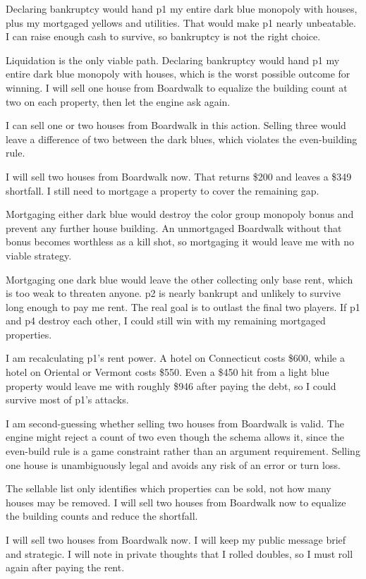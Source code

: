 Declaring bankruptcy would hand p1 my entire dark blue monopoly with houses, plus my mortgaged yellows and utilities. That would make p1 nearly unbeatable. I can raise enough cash to survive, so bankruptcy is not the right choice.

Liquidation is the only viable path. Declaring bankruptcy would hand p1 my entire dark blue monopoly with houses, which is the worst possible outcome for winning. I will sell one house from Boardwalk to equalize the building count at two on each property, then let the engine ask again.

I can sell one or two houses from Boardwalk in this action. Selling three would leave a difference of two between the dark blues, which violates the even-building rule.

I will sell two houses from Boardwalk now. That returns \$200 and leaves a \$349 shortfall. I still need to mortgage a property to cover the remaining gap.

Mortgaging either dark blue would destroy the color group monopoly bonus and prevent any further house building. An unmortgaged Boardwalk without that bonus becomes worthless as a kill shot, so mortgaging it would leave me with no viable strategy.

Mortgaging one dark blue would leave the other collecting only base rent, which is too weak to threaten anyone. p2 is nearly bankrupt and unlikely to survive long enough to pay me rent. The real goal is to outlast the final two players. If p1 and p4 destroy each other, I could still win with my remaining mortgaged properties.

I am recalculating p1's rent power. A hotel on Connecticut costs \$600, while a hotel on Oriental or Vermont costs \$550. Even a \$450 hit from a light blue property would leave me with roughly \$946 after paying the debt, so I could survive most of p1's attacks.

I am second-guessing whether selling two houses from Boardwalk is valid. The engine might reject a count of two even though the schema allows it, since the even-build rule is a game constraint rather than an argument requirement. Selling one house is unambiguously legal and avoids any risk of an error or turn loss.

The sellable list only identifies which properties can be sold, not how many houses may be removed. I will sell two houses from Boardwalk now to equalize the building counts and reduce the shortfall.

I will sell two houses from Boardwalk now. I will keep my public message brief and strategic. I will note in private thoughts that I rolled doubles, so I must roll again after paying the rent.

